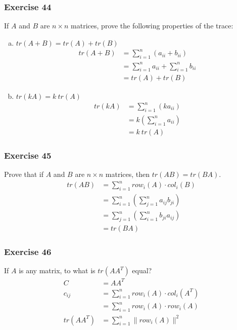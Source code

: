 \documentclass[letterpaper, 12pt]{math}
\begin{document}
\subsubsection*{Exercise 44}
If \( A \) and \( B \) are \( n\times n \) matrices, prove the following
properties of the trace:
\begin{enumerate}[(a)]
  \item \( tr(A+B) = tr(A)+tr(B) \)
  \begin{align*}
    tr(A+B) &= \sum_{i=1}^{n}(a_{ii}+b_{ii}) \\
    &= \sum_{i=1}^{n}a_{ii}+\sum_{i=1}^{n}b_{ii} \\
    &= tr(A)+tr(B)
  \end{align*}
  \item \( tr(kA) = k~tr(A) \)
  \begin{align*}
    tr(kA) &= \sum_{i=1}^{n}(ka_{ii}) \\
    &= k\left(\sum_{i=1}^{n}a_{ii}\right) \\
    &= k~tr(A)
  \end{align*}
\end{enumerate}

\subsubsection*{Exercise 45}
Prove that if \( A \) and \( B \) are \( n\times n \) matrices, then \( tr(AB)
= tr(BA) \).
\begin{align*}
  tr(AB) &= \sum_{i=1}^{n}row_i(A)\cdot col_i(B) \\
  &= \sum_{i=1}^{n}\left(\sum_{j=1}^{n}a_{ij}b_{ji}\right) \\
  &= \sum_{j=1}^{n}\left(\sum_{i=1}^{n}b_{ji}a_{ij}\right) \\
  &= tr(BA)
\end{align*}

\subsubsection*{Exercise 46}
If \( A \) is any matrix, to what is \( tr(AA^T) \) equal?
\begin{align*}
  C &= AA^T \\
  c_{ij} &= \sum_{i=1}^{n}row_i(A)\cdot col_i(A^T) \\
  &= \sum_{i=1}^{n}row_i(A)\cdot row_i(A) \\
  tr(AA^T) &= \sum_{i=1}^{n}\|row_i(A)\|^2
\end{align*}
\end{document}
